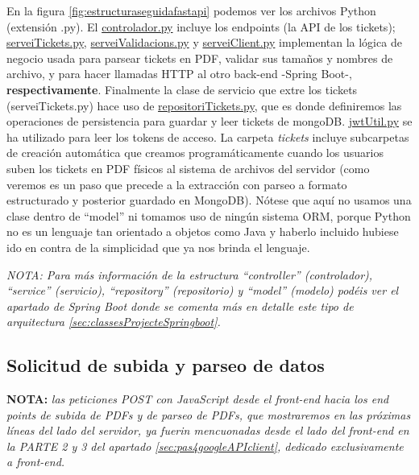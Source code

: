 \documentclass[a4paper,12pt]{report}
\begin{document}
	 En la figura \ref{fig:estructuraseguidafastapi} podemos ver los archivos Python (extensión .py). El \href{https://github.com/blackcub3s/mercApp/blob/main/APP%20WEB/__FastAPI__/app/controlador.py}{controlador.py} incluye los endpoints (la API de los tickets); \href{https://github.com/blackcub3s/mercApp/blob/main/APP%20WEB/__FastAPI__/app/serveiTickets.py}{serveiTickets.py}, \href{https://github.com/blackcub3s/mercApp/blob/main/APP%20WEB/__FastAPI__/app/serveiValidacions.py}{serveiValidacions.py} y \href{https://github.com/blackcub3s/mercApp/blob/main/APP%20WEB/__FastAPI__/app/serveiClient.py}{serveiClient.py} implementan la lógica de negocio usada para parsear tickets en PDF, validar sus tamaños y nombres de archivo, y para hacer llamadas HTTP al otro back-end -Spring Boot-, \textbf{respectivamente}. Finalmente la clase de servicio que extre los tickets (serveiTickets.py) hace uso de  \href{https://github.com/blackcub3s/mercApp/blob/main/APP%20WEB/__FastAPI__/app/repositoriTickets.py}{repositoriTickets.py}, que es donde definiremos las operaciones de persistencia para guardar y leer tickets de mongoDB. \href{https://github.com/blackcub3s/mercApp/blob/main/APP%20WEB/__FastAPI__/app/jwtUtil.py}{jwtUtil.py} se ha utilizado para leer los tokens de acceso. La carpeta \textit{tickets} incluye subcarpetas de creación automática que creamos programáticamente cuando los usuarios suben los tickets en PDF físicos al sistema de archivos del servidor (como veremos es un paso que precede a la extracción con parseo a formato estructurado y posterior guardado en MongoDB). Nótese que aquí no usamos una clase dentro de ``model'' ni tomamos uso de ningún sistema ORM, porque Python no es un lenguaje tan orientado a objetos como Java y haberlo incluido hubiese ido en contra de la simplicidad que ya nos brinda el lenguaje.
	 
\textit{NOTA: Para más información de la estructura ``controller'' (controlador), ``service'' (servicio), ``repository'' (repositorio) y ``model'' (modelo) podéis ver el apartado de Spring Boot donde se comenta más en detalle este tipo de arquitectura \ref{sec:classesProjecteSpringboot}.}
	 
	   
	\subsection{Solicitud de subida y parseo de datos}
	\label{sec:solicitudDeExtraccion}
	
	
	\textbf{NOTA:} \textit{las peticiones POST con JavaScript desde el front-end hacia los end points de subida de PDFs y de parseo de PDFs, que mostraremos en las próximas líneas del lado del servidor, ya fuerin mencuonadas desde el lado del front-end en la PARTE 2 y 3 del apartado \ref{sec:pas4googleAPIclient}, dedicado exclusivamente a front-end.}
	
\end{document}
